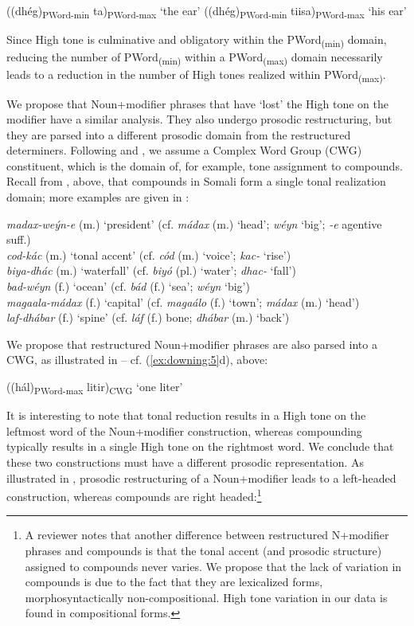 \documentclass[output=paper]{langscibook}
\begin{document}
\ea \label{ex:downing:19}
\ea ((dhég)\textsubscript{PWord-min} ta)\textsubscript{PWord-max}   ‘the ear’ \label{ex:downing:19a}
\ex ((dhég)\textsubscript{PWord-min} tiisa)\textsubscript{PWord-max}   ‘his ear’ \label{ex:downing:19b}
\z
\z

Since High tone is culminative and obligatory within the PWord\textsubscript{(min)} domain, reducing the number of PWord\textsubscript{(min)} within a PWord\textsubscript{(max)} domain necessarily leads to a reduction in the number of High tones realized within PWord\textsubscript{(max)}.

We propose that Noun+modifier phrases that have ‘lost’ the High tone on the modifier have a similar analysis. They also undergo prosodic restructuring, but they are parsed into a different prosodic domain from the restructured determiners. Following \citet{Vigário2010} and \citet{Vogel2010}, we assume a Complex Word Group (CWG) constituent, which is the domain of, for example, tone assignment to compounds. Recall from , above, that compounds in Somali form a single tonal realization domain; more examples are given in :

\ea \label{ex:downing:20}
\ea  \textit{madax-weýn-e} (m.) ‘president’ (cf. \textit{mádax} (m.) ‘head’; \textit{wéyn} ‘big’; \textit{{}-e} agentive suff.)\\
\ex   \textit{cod-kác} (m.) ‘tonal accent’ (cf. \textit{cód} (m.) ‘voice’; \textit{kac-} ‘rise’)\\
\ex   \textit{biya-dhác} (m.) ‘waterfall’ (cf. \textit{biyó} (pl.) ‘water’; \textit{dhac-} ‘fall’)\\
\ex   \textit{bad-wéyn} (f.) ‘ocean’ (cf. \textit{bád} (f.) ‘sea’; \textit{wéyn} ‘big’)\\
\ex   \textit{magaala-mádax} (f.) ‘capital’ (cf. \textit{magaálo} (f.) ‘town’; \textit{mádax} (m.) ‘head’)\\
\ex   \textit{laf-dhábar} (f.) ‘spine’ (cf. \textit{láf} (f.) bone; \textit{dhábar} (m.) ‘back’) \\
\z
\z

We propose that restructured Noun+modifier phrases are also parsed into a CWG, as illustrated in  – cf. (\ref{ex:downing:5}d), above:


\ea  ((hál)\textsubscript{PWord-max} litir)\textsubscript{CWG} ‘one liter’ \label{ex:downing:21}
\z

It is interesting to note that tonal reduction results in a High tone on the leftmost word of the Noun+modifier construction, whereas compounding typically results in a single High tone on the rightmost word. We conclude that these two constructions must have a different prosodic representation. As illustrated in , prosodic restructuring of a Noun+modifier leads to a left-headed construction, whereas compounds are right headed:\footnote{A reviewer notes that another difference between restructured N+modifier phrases and compounds is that the tonal accent (and prosodic structure) assigned to compounds never varies. We propose that the lack of variation in compounds is due to the fact that they are lexicalized forms, morphosyntactically non-compositional. High tone variation in our data is found in compositional forms.}
\end{document}
